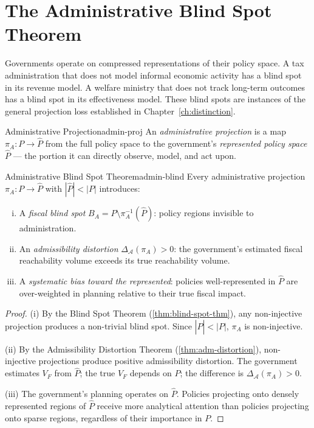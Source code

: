\documentclass[12pt,twoside,openright]{book}
\newcommand{\adm}{\mathcal{A}}
\begin{document}
\section{The Administrative Blind Spot Theorem}

Governments operate on compressed representations of
their policy space. A tax administration that does not
model informal economic activity has a blind spot in its
revenue model. A welfare ministry that does not track
long-term outcomes has a blind spot in its effectiveness
model. These blind spots are instances of the general
projection loss established in Chapter~\ref{ch:distinction}.

\begin{definition}{Administrative Projection}{admin-proj}
  An \emph{administrative projection} is a map
  $\pi_A : P \to \hat{P}$ from the full policy space
  to the government's \emph{represented policy space}
  $\hat{P}$ — the portion it can directly observe,
  model, and act upon.
\end{definition}

\begin{theorem}{Administrative Blind Spot Theorem}{admin-blind}
  Every administrative projection $\pi_A : P \to \hat{P}$
  with $|\hat{P}| < |P|$ introduces:
  \begin{enumerate}[(i)]
    \item A \emph{fiscal blind spot}
          $B_A = P \setminus \pi_A^{-1}(\hat{P})$:
          policy regions invisible to administration.
    \item An \emph{admissibility distortion}
          $\Delta_\adm(\pi_A) > 0$: the government's
          estimated fiscal reachability volume exceeds
          its true reachability volume.
    \item A \emph{systematic bias toward the represented}:
          policies well-represented in $\hat{P}$ are
          over-weighted in planning relative to their
          true fiscal impact.
  \end{enumerate}
\end{theorem}

\begin{proof}
  (i) By the Blind Spot Theorem
  (\cref{thm:blind-spot-thm}), any non-injective
  projection produces a non-trivial blind spot.
  Since $|\hat{P}| < |P|$, $\pi_A$ is non-injective.

  (ii) By the Admissibility Distortion Theorem
  (\cref{thm:adm-distortion}), non-injective projections
  produce positive admissibility distortion.
  The government estimates $V_F$ from $\hat{P}$;
  the true $V_F$ depends on $P$;
  the difference is $\Delta_\adm(\pi_A) > 0$.

  (iii) The government's planning operates on $\hat{P}$.
  Policies projecting onto densely represented regions
  of $\hat{P}$ receive more analytical attention than
  policies projecting onto sparse regions,
  regardless of their importance in $P$.
\end{proof}
\end{document}
